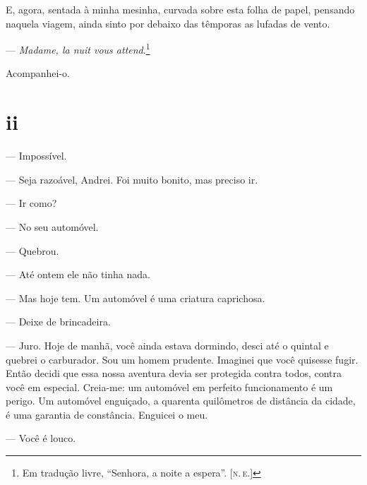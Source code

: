 E, agora, sentada à minha mesinha, curvada sobre esta folha de papel,
pensando naquela viagem, ainda sinto por debaixo das têmporas as lufadas
de vento.


--- \emph{Madame, la nuit vous attend}.\footnote{Em tradução livre, ``Senhora, a noite a espera''. \textsc{{[}n.\,e.{]}}}


Acompanhei-o.

\section{ii}

 

--- Impossível.

--- Seja razoável, Andrei. Foi muito bonito, mas preciso ir.

--- Ir como?

--- No seu automóvel.

--- Quebrou.

--- Até ontem ele não tinha nada.

--- Mas hoje tem. Um automóvel é uma criatura caprichosa.

--- Deixe de brincadeira.

--- Juro. Hoje de manhã, você ainda estava dormindo, desci até o quintal
e quebrei o carburador. Sou um homem prudente. Imaginei que você
quisesse fugir. Então decidi que essa nossa aventura devia ser protegida
contra todos, contra você em especial. Creia-me: um automóvel em
perfeito funcionamento é um perigo. Um automóvel enguiçado, a quarenta
quilômetros de distância da cidade, é uma garantia de constância.
Enguicei o meu.

--- Você é louco.

